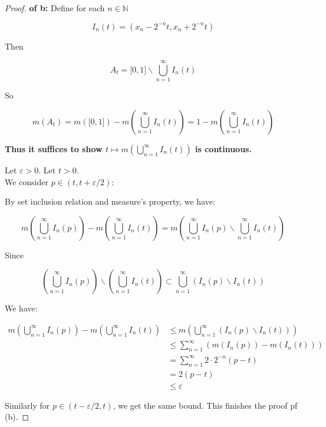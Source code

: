 \begin{proof}

\textbf{of b:} Define for each \(n \in \mathbb{N}\)

\[I_{n}(t) = (x_{n} - 2^{- n}t,x_{n} + 2^{- n}t)\]

Then

\[A_{t} = \lbrack 0,1\rbrack\backslash\bigcup\limits_{n = 1}^{\infty}I_{n}(t)\]

So

\[m(A_{t}) = m(\lbrack 0,1\rbrack) - m(\bigcup\limits_{n = 1}^{\infty}I_{n}(t)) = 1 - m(\bigcup\limits_{n = 1}^{\infty}I_{n}(t))\]

\textbf{Thus it suffices to show \(t\mapsto m(\bigcup_{n = 1}^{\infty}I_{n}(t))\) is continuous.}

Let \(\varepsilon > 0\). Let \(t > 0\).\\
We consider \(p \in (t,t + \varepsilon/2)\):

By set inclusion relation and measure's property, we have:

\[m(\bigcup\limits_{n = 1}^{\infty}I_{n}(p)) - m(\bigcup\limits_{n = 1}^{\infty}I_{n}(t)) = m(\bigcup\limits_{n = 1}^{\infty}I_{n}(p)\backslash\bigcup\limits_{n = 1}^{\infty}I_{n}(t))\]

Since

\[(\bigcup\limits_{n = 1}^{\infty}I_{n}(p))\backslash(\bigcup\limits_{n = 1}^{\infty}I_{n}(t)) \subset \bigcup\limits_{n = 1}^{\infty}(I_{n}(p)\backslash I_{n}(t))\]

We have:

\[\begin{matrix}
{m(\bigcup\limits_{n = 1}^{\infty}I_{n}(p)) - m(\bigcup\limits_{n = 1}^{\infty}I_{n}(t))} & {\leq m(\bigcup\limits_{n = 1}^{\infty}(I_{n}(p)\backslash I_{n}(t)))} \\
 & {\leq \sum\limits_{n = 1}^{\infty}(m(I_{n}(p)) - m(I_{n}(t)))} \\
 & {= \sum\limits_{n = 1}^{\infty}2 \cdot 2^{- n}(p - t)} \\
 & {= 2(p - t)} \\
 & {\leq \varepsilon}
\end{matrix}\]

Similarly for \(p \in (t - \varepsilon/2,t)\), we get the same bound. This finishes the proof pf (b).

\end{proof}

